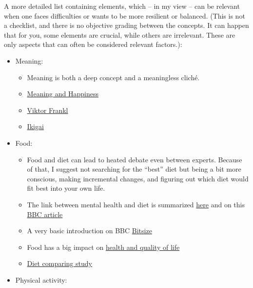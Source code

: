 \documentclass{article}
\begin{document}
A more detailed list containing elements, which -- in my view -- can be relevant when one faces difficulties or wants to be more resilient or balanced.
(This is not a checklist, and there is no objective grading between the concepts. It can happen that for you, some elements are crucial, while others are irrelevant. These are only aspects that can often be considered relevant factors.):

\begin{itemize}
    \item Meaning:
    \begin{itemize}
        \item Meaning is both a deep concept and a meaningless cliché.
        \item \href{https://greatergood.berkeley.edu/article/item/happy_life_different_from_meaningful_life}{Meaning and Happiness}
        \item \href{https://www.brainpickings.org/2013/03/26/viktor-frankl-mans-search-for-meaning/}{Viktor Frankl} 
        \item \href{https://en.wikipedia.org/wiki/Ikigai}{Ikigai}
    \end{itemize}
    \item Food:
    \begin{itemize}
        \item Food and diet can lead to heated debate even between experts. Because of that, I suggest not searching for the ``best'' diet but being a bit more conscious, making incremental changes, and figuring out which diet would fit best into your own life.
        \item The link between mental health and diet is summarized \href{https://www.mentalhealth.org.uk/explore-mental-health/a-z-topics/diet-and-mental-health}{here} and on this \href{https://www.bbc.co.uk/food/articles/diet_wellbeing}{BBC article}
        \item A very basic introduction on BBC \href{https://www.bbc.co.uk/bitesize/topics/zf339j6/articles/zmwvgdm}{Bitsize}
        \item Food has a big impact on \href{https://www.healthline.com/nutrition/healthy-eating-for-beginners}{health and quality of life}
        \item \href{https://www.annualreviews.org/doi/full/10.1146/annurev-publhealth-032013-182351}{Diet comparing study}
    \end{itemize}
    \item Physical activity:
    \begin{itemize}

\end{itemize}
\end{itemize}
\end{document}
